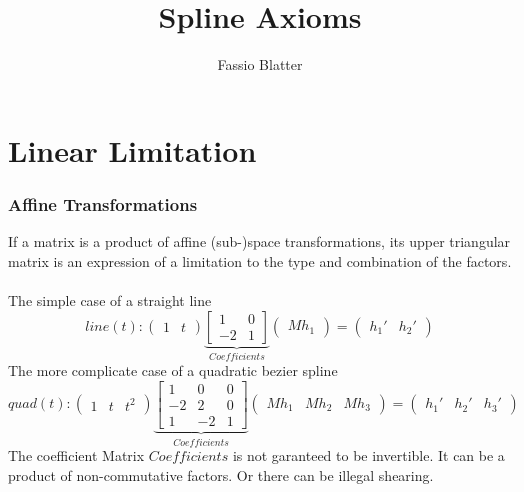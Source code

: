 \documentclass{report}
\begin{document}
\title{Spline Axioms}
\author{Fassio Blatter}
\maketitle

\chapter{Linear Limitation}

\subsection{Affine Transformations}
If a matrix is a product of affine (sub-)space transformations, its upper triangular matrix is an expression of a limitation to the type and combination of the factors.\\\\
The simple case of a straight line
\begin{equation}
line(t):
\begin{pmatrix}
1 & t
\end{pmatrix}
\underbrace{\begin{bmatrix}
1 & 0\\
-2 & 1
\end{bmatrix}}_{Coefficients}
\begin{pmatrix}
Mh_{1}
\end{pmatrix}
=
\begin{pmatrix}
h_{1}' & h_{2}'
\end{pmatrix}
\end{equation}
The more complicate case of a quadratic bezier spline
\begin{equation}
quad(t):
\begin{pmatrix}
1 & t & t^2
\end{pmatrix}
\underbrace{\begin{bmatrix}
1 & 0 & 0\\
-2 & 2 & 0\\
1 & -2 &1
\end{bmatrix}}_{Coefficients}
\begin{pmatrix}
Mh_{1} & Mh_{2} & Mh_{3}
\end{pmatrix}
=
\begin{pmatrix}
h_{1}' & h_{2}' & h_{3}'
\end{pmatrix}
\end{equation}
The coefficient Matrix $Coefficients$ is not garanteed to be invertible. It can be a product of non-commutative factors. Or there can be illegal shearing.
\end{document}
